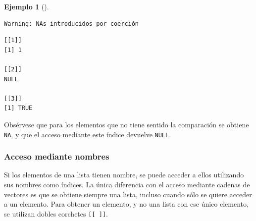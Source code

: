 \documentclass[
  a4paper,
]{scrreport}
\theoremstyle{definition}
\newtheorem{example}{Ejemplo}[chapter]
\theoremstyle{definition}
\theoremstyle{remark}
\begin{document}
\begin{example}[]
\begin{verbatim}
Warning: NAs introducidos por coerción
\end{verbatim}

\begin{verbatim}
[[1]]
[1] 1

[[2]]
NULL

[[3]]
[1] TRUE
\end{verbatim}

Obsérvese que para los elementos que no tiene sentido la comparación se
obtiene \texttt{NA}, y que el acceso mediante este índice devuelve
\texttt{NULL}.

\end{example}

\hypertarget{acceso-mediante-nombres}{%
\subsubsection{Acceso mediante nombres}\label{acceso-mediante-nombres}}

Si los elementos de una lista tienen nombre, se puede acceder a ellos
utilizando sus nombres como índices. La única diferencia con el acceso
mediante cadenas de vectores es que se obtiene siempre una lista,
incluso cuando sólo se quiere acceder a un elemento. Para obtener un
elemento, y no una lista con ese único elemento, se utilizan dobles
corchetes \texttt{{[}{[}\ {]}{]}}.
\end{document}
